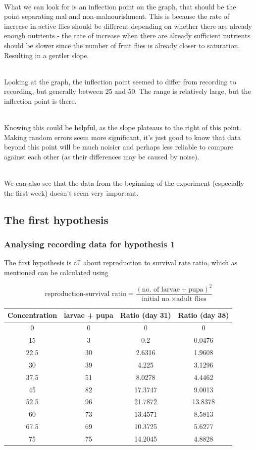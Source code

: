 \documentclass{article}
\begin{document}
\noindent\\
What we can look for is an inflection point on the graph, that should be the point separating mal and non-malnourishment. This is because the rate of increase in active flies should be different depending on whether there are already enough nutrients - the rate of increase when there are already sufficient nutrients should be slower since the number of fruit flies is already closer to saturation. Resulting in a gentler slope.

\noindent\\
Looking at the graph, the inflection point seemed to differ from recording to recording, but generally between 25 and 50. The range is relatively large, but the inflection point is there.

\noindent\\
Knowing this could be helpful, as the slope plateaus to the right of this point. Making random errors seem more significant, it's just good to know that data beyond this point will be much noisier and perhaps less reliable to compare against each other (as their differences may be caused by noise).

\noindent\\
We can also see that the data from the beginning of the experiment (especially the first week) doesn't seem very important.

\subsection{The first hypothesis}

\subsubsection{Analysing recording data for hypothesis 1}

The first hypothesis is all about reproduction to survival rate ratio, which as mentioned can be calculated using

$$\text{reproduction-survival ratio}=\frac{(\text{no. of larvae}+\text{pupa})^2}{\text{initial no.}\times\text{adult flies}}$$

\begin{table}[h]
\centering
\begin{tabular}{|c|c|c|c|}
  \hline
  Concentration & larvae + pupa & Ratio (day 31) & Ratio (day 38)\\
  \hline
  \hline
  0 & 0 & 0 & 0\\
  15 & 3 & 0.2 & 0.0476\\
  22.5 & 30 & 2.6316 & 1.9608\\
  30 & 39 & 4.225 & 3.1296\\
  37.5 & 51 & 8.0278 & 4.4462\\
  45 & 82 & 17.3747 & 9.0013\\
  52.5 & 96 & 21.7872 & 13.8378\\
  60 & 73 & 13.4571 & 8.5813\\
  67.5 & 69 & 10.3725 & 5.6277\\
  75 & 75 & 14.2045 & 4.8828\\
  \hline
\end{tabular}
\end{table}
\end{document}
